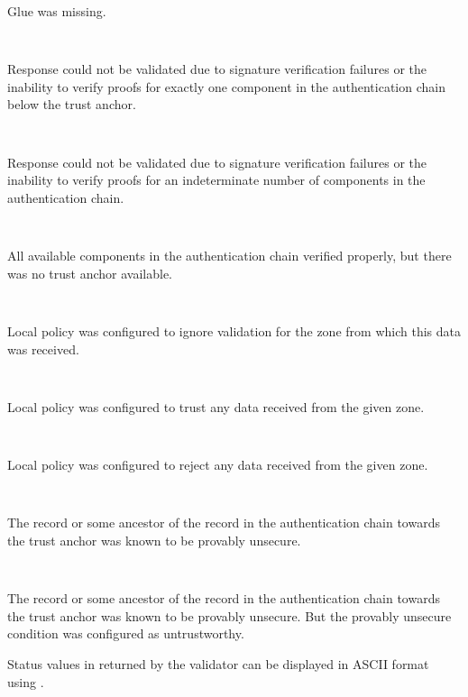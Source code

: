 \begin{description}
\begin{description}
\begin{description}
Glue was missing.

\item {}\verb" "

Response could not be validated due to signature
verification failures or the inability to verify
proofs for exactly one component in the
authentication chain below the trust anchor.

\item {}\verb" "

Response could not be validated due to signature
verification failures or the inability to verify
proofs for an indeterminate number of components
in the authentication chain.

\item {}\verb" "

All available components in the authentication
chain verified properly, but there was no trust
anchor available.

\item {}\verb" "

Local policy was configured to ignore validation
for the zone from which this data was received.

\item {}\verb" "

Local policy was configured to trust any data
received from the given zone.

\item {}\verb" "

Local policy was configured to reject any data
received from the given zone.

\item {}\verb" "

The record or some ancestor of the record in the
authentication chain towards the trust anchor was
known to be provably unsecure.

\item {}\verb" "

The record or some ancestor of the record in the
authentication chain towards the trust anchor
was known to be provably unsecure. But the
provably unsecure condition was configured as
untrustworthy.

\end{description}

Status values in  returned by the validator can be
displayed in ASCII format using .

\end{description}

\end{description}

